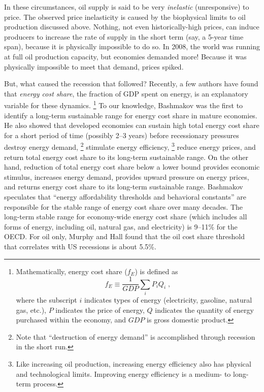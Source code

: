 In these circumstances, 
oil supply is said to be very \emph{inelastic} (unresponsive) to price.
The observed price inelasticity is caused by 
the biophysical limits to oil production discussed above.
Nothing, not even historically-high prices, can induce producers to 
increase the rate of supply in the short term (say, a 5-year time span), 
because it is physically impossible to do so.
In 2008, the world was running at full oil production capacity, 
but economies demanded more!
Because it was physically impossible to meet that demand,
prices spiked.

But, what caused the recession that followed?
Recently, a few authors have found that \emph{energy cost share},
the fraction of GDP spent on energy, 
is an explanatory variable for these dynamics.%
	\footnote{
	Mathematically, energy cost share ($f_E$) is defined as
	\begin{equation}
		f_E \equiv \frac{1}{GDP} \displaystyle\sum_i P_i Q_i \; ,
	\end{equation}
	where 
	the subscript $i$ indicates types of energy 
	(electricity, gasoline, natural gas, etc.),
	$P$ indicates the price of energy,
	$Q$ indicates the quantity of energy purchased within the economy, and
	$GDP$ is gross domestic product.
	}
To our knowledge, 
Bashmakov was the first to 
identify a long-term sustainable range for energy cost share
in mature economies.\cite{Bashmakov:2007ek} 
He also showed that developed economies 
can sustain high total energy cost share
for a short period of time 
(possibly 2--3 years) 
before recessionary pressures 
destroy energy demand,%
	\footnote{
	Note that ``destruction of energy demand'' 
	is accomplished through recession
	in the short run.
	}
stimulate energy efficiency,%
	\footnote{
	Like increasing oil production, 
	increasing energy efficiency also has 
	physical and technological limits.
	Improving energy efficiency is a medium- to long-term process. 
	}
reduce energy prices, 
and return total energy cost share to its long-term sustainable range.
On the other hand, reduction of total energy cost share below 
a lower bound provides economic stimulus, 
increases energy demand, 
provides upward pressure on energy prices, 
and returns energy cost share to its long-term sustainable range.
Bashmakov speculates that 
``energy affordability thresholds and behavioral constants'' 
are responsible for the stable range of energy cost share 
over many decades.\cite[p.~3585]{Bashmakov:2007ek} 
The long-term stable range for economy-wide energy cost share 
(which includes all forms of energy, including oil, natural gas, and electricity)
is 9--11\% for the OECD. 
For oil only, Murphy and Hall found that 
the oil cost share threshold that correlates with US recessions 
is about 5.5\%.\cite{Murphy:2011jh}

